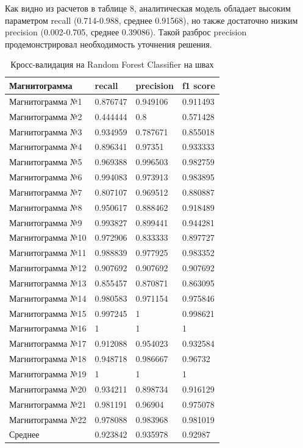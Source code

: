 \documentclass[a4paper,article,14pt]{extarticle}
\begin{document}
Как видно из расчетов в таблице 8, аналитическая модель обладает высоким параметром recall (0.714-0.988, среднее 0.91568), но также достаточно низким precision (0.002-0.705, среднее 0.39086). 
Такой разброс precision продемонстрировал необходимость уточнения решения.

\begin{center}
    \begin{longtable}{|p{5cm}|p{3cm}|p{3cm}|p{3cm}|}
        \caption{Кросс-валидация на Random Forest Classifier на швах}\\\hline
        Магнитограмма & recall & precision & f1 score \\ \hline
        Магнитограмма №1 & 0.876747 & 0.949106 & 0.911493 \\ \hline
        Магнитограмма №2 & 0.444444 & 0.8 & 0.571428 \\ \hline
        Магнитограмма №3 & 0.934959 & 0.787671 & 0.855018 \\ \hline
        Магнитограмма №4 & 0.896341 & 0.97351 & 0.933333 \\ \hline
        Магнитограмма №5 & 0.969388 & 0.996503 & 0.982759 \\ \hline
        Магнитограмма №6 & 0.994083 & 0.973913 & 0.983895 \\ \hline
        Магнитограмма №7 & 0.807107 & 0.969512 & 0.880887 \\ \hline
        Магнитограмма №8 & 0.950617 & 0.888462 & 0.918489 \\ \hline
        Магнитограмма №9 & 0.993827 & 0.899441 & 0.944281 \\ \hline
        Магнитограмма №10 & 0.972906 & 0.833333 & 0.897727 \\ \hline
        Магнитограмма №11 & 0.988839 & 0.977925 & 0.983352 \\ \hline
        Магнитограмма №12 & 0.907692 & 0.907692 & 0.907692 \\ \hline
        Магнитограмма №13 & 0.855457 & 0.870871 & 0.863095 \\ \hline
        Магнитограмма №14 & 0.980583 & 0.971154 & 0.975846 \\ \hline
        Магнитограмма №15 & 0.997245 & 1 & 0.998621 \\ \hline
        Магнитограмма №16 & 1 & 1 & 1 \\ \hline
        Магнитограмма №17 & 0.912088 & 0.954023 & 0.932584 \\ \hline
        Магнитограмма №18 & 0.948718 & 0.986667 & 0.96732 \\ \hline
        Магнитограмма №19 & 1 & 1 & 1 \\ \hline
        Магнитограмма №20 & 0.934211 & 0.898734 & 0.916129 \\ \hline
        Магнитограмма №21 & 0.981191 & 0.96904 & 0.975078 \\ \hline
        Магнитограмма №22 & 0.978088 & 0.983968 & 0.981019 \\ \hline
        Среднее & 0.923842 & 0.935978 & 0.92987 \\ \hline
    \end{longtable}
\end{center}
\end{document}
